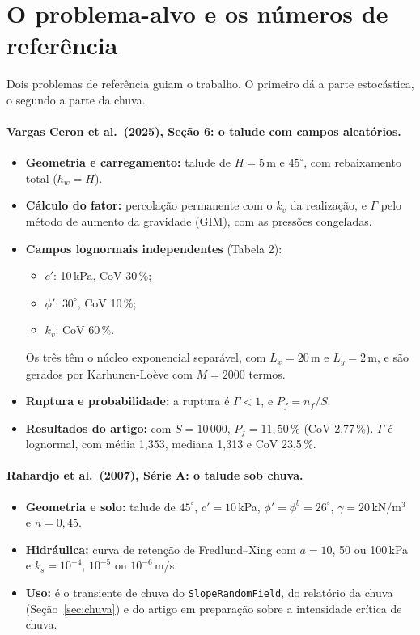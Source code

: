 \section{O problema-alvo e os números de referência}
\label{sec:alvo}

Dois problemas de referência guiam o trabalho. O primeiro dá a parte estocástica, o segundo a parte da chuva.

\paragraph{Vargas Ceron et al.\ (2025), Seção 6: o talude com campos aleatórios.}
\begin{itemize}
  \item \textbf{Geometria e carregamento:} talude de $H = 5$\,m e $45^\circ$, com rebaixamento total ($h_w = H$).
  \item \textbf{Cálculo do fator:} percolação permanente com o $k_v$ da realização, e $\Gamma$ pelo método de aumento
    da gravidade (GIM), com as pressões congeladas.
  \item \textbf{Campos lognormais independentes} (Tabela 2):
    \begin{itemize}
      \item $c'$: 10\,kPa, CoV 30\,\%;
      \item $\phi'$: $30^\circ$, CoV 10\,\%;
      \item $k_v$: CoV 60\,\%.
    \end{itemize}
    Os três têm o núcleo exponencial separável, com $L_x = 20$\,m e $L_y = 2$\,m, e são gerados por Karhunen-Loève com
    $M = 2000$ termos.
  \item \textbf{Ruptura e probabilidade:} a ruptura é $\Gamma < 1$, e $P_f = n_f/S$.
  \item \textbf{Resultados do artigo:} com $S = 10\,000$, $P_f = 11{,}50\,\%$ (CoV 2,77\,\%). $\Gamma$ é lognormal, com
    média 1,353, mediana 1,313 e CoV 23,5\,\%.
\end{itemize}

\paragraph{Rahardjo et al.\ (2007), Série A: o talude sob chuva.}
\begin{itemize}
  \item \textbf{Geometria e solo:} talude de $45^\circ$, $c' = 10$\,kPa, $\phi' = \phi^b = 26^\circ$, $\gamma = 20$\,kN/m$^3$
    e $n = 0{,}45$.
  \item \textbf{Hidráulica:} curva de retenção de Fredlund--Xing com $a = 10$, 50 ou 100\,kPa e $k_s = 10^{-4}$, $10^{-5}$
    ou $10^{-6}$\,m/s.
  \item \textbf{Uso:} é o transiente de chuva do \texttt{SlopeRandomField}, do relatório da chuva
    (Seção~\ref{sec:chuva}) e do artigo em preparação sobre a intensidade crítica de chuva.
\end{itemize}

